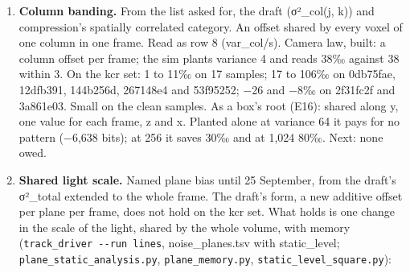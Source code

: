 \begin{enumerate}
\item \textbf{Column banding.} From the list asked for, the draft (σ²\_\allowbreak{}col(j, k)) and compression's spatially correlated category. An offset shared by every voxel of one column in one frame. Read as row 8 (var\_\allowbreak{}col/s). Camera law, built: a column offset per frame; the sim plants variance 4 and reads 38‰ against 38 within 3. On the kcr set: 1 to 11‰ on 17 samples; 17 to 106‰ on 0db75fae, 12dfb391, 144b256d, 267148e4 and 53f95252; −26 and −8‰ on 2f31fc2f and 3a861e03. Small on the clean samples. As a box's root (E16): shared along y, one value for each frame, z and x. Planted alone at variance 64 it pays for no pattern (−6,638 bits); at 256 it saves 30‰ and at 1,024 80‰. Next: none owed.
\item \textbf{Shared light scale.} Named plane bias until 25 September, from the draft's σ²\_\allowbreak{}total extended to the whole frame. The draft's form, a new additive offset per plane per frame, does not hold on the kcr set. What holds is one change in the scale of the light, shared by the whole volume, with memory (\texttt{track\_\allowbreak{}driver -\allowbreak{}-\allowbreak{}run lines}, noise\_\allowbreak{}planes.tsv with static\_\allowbreak{}level; \texttt{plane\_\allowbreak{}static\_\allowbreak{}analysis.\allowbreak{}py}, \texttt{plane\_\allowbreak{}memory.\allowbreak{}py}, \texttt{static\_\allowbreak{}level\_\allowbreak{}square.\allowbreak{}py}):


\end{enumerate}
